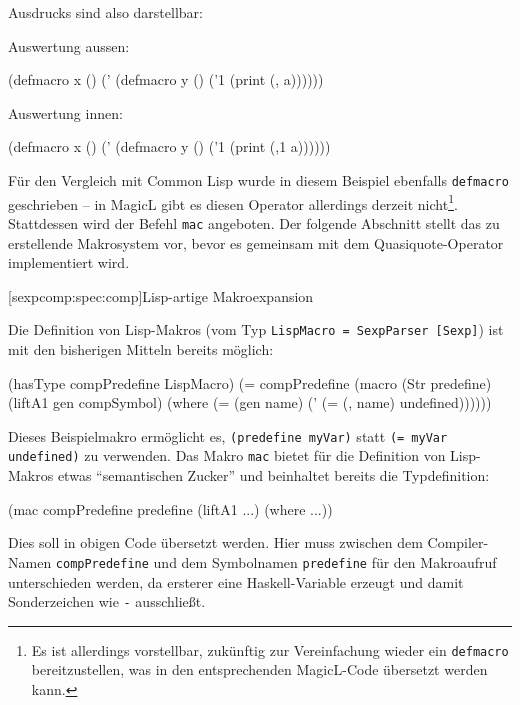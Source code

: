 \documentclass[12pt, a4paper, bibgerm]{scrbook}
\newenvironment{DIFnomarkup}{}{}
\newcommand\icode[1]{\lstinline?#1?}
\newcommand\lsubsection{}
\begin{document}
Ausdrucks sind also darstellbar:
\begin{DIFnomarkup}\begin{code}
Auswertung aussen:

(defmacro x ()
  (' (defmacro y ()
       ('1 (print (, a))))))


Auswertung innen:

(defmacro x ()
  (' (defmacro y ()
       ('1 (print (,1 a))))))
\end{code}\end{DIFnomarkup}
Für den Vergleich mit Common Lisp wurde in diesem Beispiel ebenfalls
\icode{defmacro} geschrieben -- in MagicL gibt es diesen Operator
allerdings derzeit nicht\footnote{Es ist allerdings vorstellbar,
  zukünftig zur Vereinfachung wieder ein \icode{defmacro}
  bereitzustellen, was in den entsprechenden MagicL-Code übersetzt
  werden kann.}. Stattdessen wird der Befehl \icode{mac} angeboten. Der
folgende Abschnitt stellt das zu erstellende Makrosystem vor, bevor es
gemeinsam mit dem Quasiquote-Operator implementiert wird.

\lsubsection[sexpcomp:spec:comp]{Lisp-artige Makroexpansion}

Die Definition von Lisp-Makros (vom Typ \icode{LispMacro = SexpParser [Sexp]}) ist mit
den bisherigen Mitteln bereits möglich:
\begin{DIFnomarkup}\begin{code}
(hasType compPredefine LispMacro)
(= compPredefine (macro (Str predefine)
                     (liftA1 gen compSymbol)
                   (where (= (gen name)
                             (' (= (, name) undefined))))))

\end{code}\end{DIFnomarkup}
Dieses Beispielmakro ermöglicht es, \icode{(predefine myVar)} statt
\icode{(= myVar undefined)} zu verwenden. Das Makro \icode{mac} bietet
für die Definition von Lisp-Makros etwas ``semantischen Zucker'' und
beinhaltet bereits die Typdefinition:
\begin{DIFnomarkup}\begin{code}
(mac compPredefine predefine
     (liftA1 ...)
   (where ...))
\end{code}\end{DIFnomarkup}
Dies soll in obigen Code übersetzt werden. Hier muss zwischen dem
Compiler-Namen \icode{compPredefine} und dem Symbolnamen
\icode{predefine} für den Makroaufruf unterschieden werden, da ersterer
eine Haskell-Variable erzeugt und damit Sonderzeichen wie \icode{-}
ausschließt.
\end{document}
